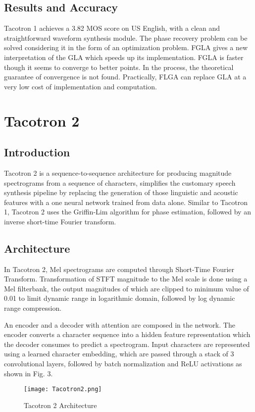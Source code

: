 \documentclass[runningheads]{llncs}
\begin{document}
\subsection{Results and Accuracy}
Tacotron 1 achieves a 3.82 MOS score on US English\cite{ref_paper3}, with a clean and straightforward waveform synthesis module. The phase recovery problem can be solved considering it in the form of an optimization problem. FGLA gives a new interpretation of the GLA which speeds up its implementation. FGLA is faster though it seems to converge to better points. In the process, the theoretical guarantee of convergence is not found. Practically, FLGA can replace GLA at a very low cost of implementation and computation.

\section{Tacotron 2}
\subsection{Introduction}
Tacotron 2\cite{ref_paper5} is a sequence-to-sequence architecture for producing magnitude spectrograms from a sequence of characters, simplifies the customary speech synthesis pipeline by replacing the generation of those linguistic and acoustic features with a one neural network trained from data alone. Similar to Tacotron 1, Tacotron 2 uses the Griffin-Lim algorithm for phase estimation, followed by an inverse short-time Fourier transform.

\subsection{Architecture}
In Tacotron 2, Mel spectrograms are computed through Short-Time Fourier Transform. Transformation of STFT magnitude to the Mel scale is done using a Mel filterbank, the output magnitudes of which are clipped to minimum value of 0.01 to limit dynamic range in logarithmic domain, followed by log dynamic range compression.  

An encoder and a decoder with attention are composed in the network. The encoder converts a character sequence into a hidden feature representation which the decoder consumes to predict a spectrogram. Input characters are represented using a learned character embedding, which are passed through a stack of 3 convolutional layers, followed by batch normalization and ReLU activations as shown in Fig. 3. 
\begin{figure}[htbp]
\centerline{\texttt{[image: Tacotron2.png]}}
\caption{Tacotron 2 Architecture \cite{ref_paper5}}
\end{figure}
\end{document}
